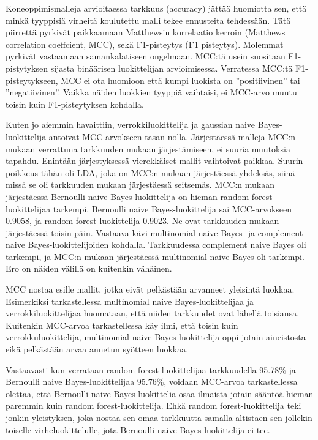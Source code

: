 \documentclass[finnish,twoside,openright]{HYgraduMLDS}
\begin{document}
Koneoppimismalleja arvioitaessa tarkkuus (accuracy) jättää huomiotta sen, että minkä tyyppisiä virheitä koulutettu malli tekee ennusteita tehdessään. Tätä piirrettä pyrkivät paikkaamaan Matthewsin korrelaatio kerroin (Matthews correlation coeffcient, MCC), sekä F1-pisteytys (F1 pisteytys). Molemmat pyrkivät vastaamaan samankalatiseen ongelmaan. MCC:tä usein suositaan F1-pistytyksen sijasta \cite{chicco2020advantages} binäärisen luokittelijan arvioimisessa. Verratessa MCC:tä F1-pisteytykseen, MCC ei ota huomioon että kumpi luokista on ''positiivinen'' tai ''negatiivinen''. Vaikka näiden luokkien tyyppiä vaihtaisi, ei MCC-arvo muutu toisin kuin F1-pisteytyksen kohdalla.

Kuten jo aiemmin havaittiin, verrokkiluokittelija ja gaussian naive Bayes-luokittelija antoivat MCC-arvokseen tasan nolla. Järjestäessä malleja MCC:n mukaan verrattuna tarkkuuden mukaan järjestämiseen, ei suuria muutoksia tapahdu. Enintään järjestyksessä vierekkäiset mallit vaihtoivat paikkaa. Suurin poikkeus tähän oli LDA, joka on MCC:n mukaan järjestäessä yhdeksäs, siinä missä se oli tarkkuuden mukaan järjestäessä seitsemäs. MCC:n mukaan järjestäessä Bernoulli naive Bayes-luokittelija on hieman random forest-luokittelijaa tarkempi. Bernoulli naive Bayes-luokittelija sai MCC-arvokseen 0.9058, ja random forest-luokittelija 0.9023. Ne ovat tarkkuuden mukaan järjestäessä toisin päin. Vastaava kävi multinomial naive Bayes- ja complement naive Bayes-luokittelijoiden kohdalla. Tarkkuudessa complement naive Bayes oli tarkempi, ja MCC:n mukaan järjestäessä multinomial naive Bayes oli tarkempi. Ero on näiden välillä on kuitenkin vähäinen. 

MCC nostaa esille mallit, jotka eivät pelkästään arvanneet yleisintä luokkaa. Esimerkiksi tarkastellessa multinomial naive Bayes-luokittelijaa ja verrokkiluokittelijaa huomataan, että niiden tarkkuudet ovat lähellä toisiansa. Kuitenkin MCC-arvoa tarkastellessa käy ilmi, että toisin kuin verrokkuluokittelija, multinomial naive Bayes-luokittelija oppi jotain aineistosta eikä pelkästään arvaa annetun syötteen luokkaa.

Vastaavasti kun verrataan random forest-luokittelijaa tarkkuudella 95.78\% ja Bernoulli naive Bayes-luokittelijaa 95.76\%, voidaan MCC-arvoa tarkastellessa olettaa, että Bernoulli naive Bayes-luokittelia osaa ilmaista jotain sääntöä hieman paremmin kuin random forest-luokittelija. Ehkä random forest-luokittelija teki jonkin yleistyksen, joka nostaa sen omaa tarkkuutta samalla altistaen sen jollekin toiselle virheluokittelulle, jota Bernoulli naive Bayes-luokittelija ei tee.
\end{document}
